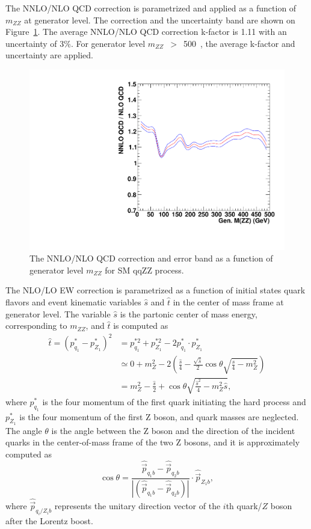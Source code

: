 \vspace{0.3cm}
The NNLO/NLO QCD correction is parametrized and applied as a function of $m_{ZZ}$ 
at generator level. 
The correction and the uncertainty band are shown on Figure~\ref{fig:qqzz_nnlo_qcd}.
The average NNLO/NLO QCD correction k-factor is 1.11 with an uncertainty of 3\%.
For generator level $m_{ZZ}$~$>$~500~\GeV, the average k-factor and uncertainty are applied. 

\begin{figure}[htbp!]
\centering
  \includegraphics[width=0.48\linewidth]{figures/h_nnlo_to_nlo_vs_mzz.pdf}
  \caption{The NNLO/NLO QCD correction and error band as a function of generator level $m_{ZZ}$ for SM qqZZ process.}
  \label{fig:qqzz_nnlo_qcd}
\end{figure}

\vspace{0.3cm}
The NLO/LO EW correction is parametrized as a function of initial states quark flavors and event kinematic variables $\hat{s}$ and $\hat{t}$
in the center of mass frame at generator level. 
The variable $\hat{s}$ is the partonic center of mass energy, corresponding to $m_{ZZ}$,
and $\hat{t}$ is computed as
\begin{align*}
\hat{t} = \left(p^*_{q_1}-p^*_{Z_1}\right)^2 & = p_{q_1}^{*2} +
p_{Z_1}^{*2} - 2 p^*_{q_1} \cdot p^*_{Z_1} \\
& \simeq 0 + m_{Z}^{2} - 2 \left( \frac{\hat{s}}{4} -
\frac{\sqrt{\hat{s}}}{2} \cos{\theta} \sqrt{\frac{\hat{s}}{4} -
m_{Z}^{2}} \right) \\
& = m_{Z}^{2} - \frac{\hat{s}}{2} + \cos{\theta}
\sqrt{\frac{\hat{s}^2}{4} - m_{Z}^{2}\hat{s}},
\end{align*}
where $p^*_{q_1}$ is the four momentum of the first quark initiating the hard process and 
$p^*_{Z_1}$  is the four momentum of the first Z boson, and quark masses are neglected.
The angle $\theta$ is the angle between the Z boson and the direction of the
incident quarks in the center-of-mass frame of the two Z bosons, and it is approximately computed as 
\begin{equation*}
\cos{\theta} = \frac{\hat{\vec{p}}_{q_1b} -
\hat{\vec{p}}_{q_2b}}{\left|\left( \hat{\vec{p}}_{q_1b} -
\hat{\vec{p}}_{q_2b} \right)\right|} \cdot \hat{\vec{p}}_{Z_1b},
\end{equation*}
where $\hat{\vec{p}}_{q_i/Z_ib}$ represents the unitary direction vector of the
$i$th quark/$Z$ boson after the Lorentz boost. 

